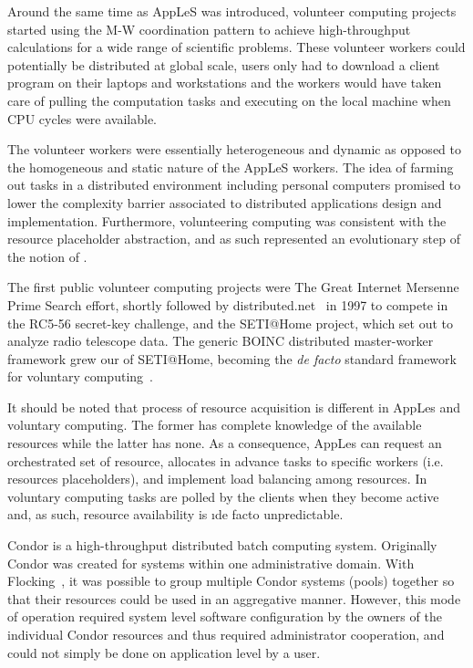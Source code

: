 \documentclass{sig-alternate}
\begin{document}
Around the same time as AppLeS was introduced, volunteer computing projects
started using the M-W coordination pattern to achieve high-throughput
calculations for a wide range of scientific problems. These volunteer workers
could potentially be distributed at global scale, users only had to download a
client program on their laptops and workstations and the workers would have
taken care of pulling the computation tasks and executing on the local machine
when CPU cycles were available.

The volunteer workers were essentially heterogeneous and dynamic as opposed to
the homogeneous and static nature of the AppLeS workers. The idea of farming
out tasks in a distributed environment including personal computers promised to
lower the complexity barrier associated to distributed applications design and
implementation. Furthermore, volunteering computing was consistent with the
resource placeholder abstraction, and as such represented an evolutionary step
of the notion of \pilot.

The first public volunteer computing projects were The Great Internet Mersenne
Prime Search effort\cite{woltman:2004:gimps}, shortly followed by
distributed.net~\cite{Lawton:2000:distributednet} in 1997 to compete in the
RC5-56 secret-key challenge, and the SETI@Home project, which set out to
analyze radio telescope data. The generic BOINC distributed master-worker
framework grew our of SETI@Home, becoming the {\it de facto} standard framework
for voluntary computing~\cite{Anderson:2004:BSP:1032646.1033223}.

It should be noted that process of resource acquisition is different in AppLes
and voluntary computing. The former has complete knowledge of the available
resources while the latter has none. As a consequence, AppLes can request an
orchestrated set of resource, allocates in advance tasks to specific workers
(i.e. resources placeholders), and implement load balancing among resources. In
voluntary computing tasks are polled by the clients when they become active
and, as such, resource availability is {\i de facto} unpredictable.


Condor is a high-throughput distributed batch computing system. Originally
Condor was created for systems within one administrative domain. With
Flocking~\cite{Epema:1996:flocking}, it was possible to group multiple Condor
systems (pools) together so that their resources could be used in an
aggregative manner. However, this mode of operation required system level
software configuration by the owners of the individual Condor resources and
thus required administrator cooperation, and could not simply be done on
application level by a user.
\end{document}
